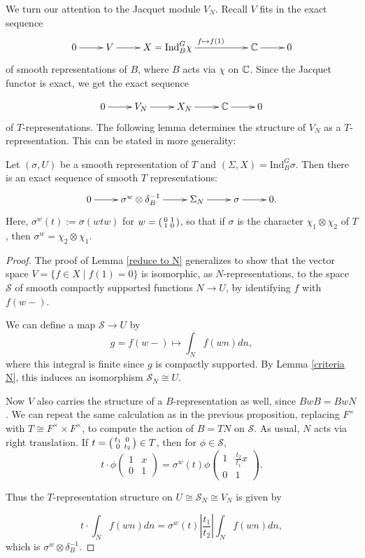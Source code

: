 We turn our attention to the Jacquet module $V_N$. Recall $V$ fits in the exact sequence
$$\xymatrix{0 \ar[r] & V \ar[r] & X = \mathrm{Ind}_B^G \chi \ar[rr]^{f \mapsto f(1)} && \CC \ar[r] & 0}$$ of smooth representations of $B$, where $B$ acts via $\chi$ on $\mathbb{C}$. Since the Jacquet functor is exact, we get the exact sequence

$$\xymatrix{0 \ar[r] & V_N \ar[r] & X_N \ar[r] & \CC \ar[r] & 0}$$ of $T$-representations. The following lemma determines the structure of $V_N$ as a $T$-representation. This can be stated in more generality:

\begin{lemma}
    Let $(\sigma, U)$ be a smooth representation of $T$ and $(\Sigma, X) = \mathrm{Ind}_B^G \sigma$. Then there is an exact sequence of smooth $T$ representations:
    $$\xymatrix{0 \ar[r] & \sigma^w \otimes \delta_B^{-1} \ar[r] & \Sigma_N \ar[r] & \sigma \ar[r] & 0.}$$
    Here, $\sigma^w(t) := \sigma(wtw)$ for $w=\begin{psmallmatrix}
        0&1\\1&0
    \end{psmallmatrix}$, so that if $\sigma$ is the character $\chi_1 \otimes \chi_2$ of $T$, then $\sigma^w = \chi_2\otimes \chi_1$.
\end{lemma}
\begin{proof}
    The proof of Lemma \ref{reduce to N} generalizes to show that the vector space $V = \{f \in X \mid f(1)=0\}$ is isomorphic, as $N$-representations, to the space $\mathcal S$ of smooth compactly supported functions $N \to U$, by identifying $f$ with $f(w-)$.



    We can define a map $\mathcal S \to U$ by 
    $$g=f(w-) \mapsto \int_N f(wn) dn,$$ where this integral is finite since $g$ is compactly supported. By Lemma \ref{criteria N}, this induces an isomorphism $\mathcal S_N \cong U$.


    Now $V$ also carries the structure of a $B$-representation as well, since $BwB=BwN$. We can repeat the same calculation as in the previous proposition, replacing $F^\times$ with $T\cong F^\times \times F^\times$, to compute the action of $B=TN$ on $\mathcal S$. As usual, $N$ acts via right translation. If $t=\begin{psmallmatrix}
        t_1&0 \\0 & t_2
    \end{psmallmatrix} \in T$, then for $\phi \in \mathcal S$, 
    $$t\cdot \phi \begin{pmatrix}
        1&x\\0&1
    \end{pmatrix} = \sigma^w(t) \phi \begin{pmatrix}
        1&\frac{t_2}{t_1}x \\ 0&1
    \end{pmatrix}.$$

    Thus the $T$-representation structure on $U \cong \mathcal S_N \cong V_N$ is given by 

    $$t \cdot \int_N f(wn)dn = \sigma^w(t) \left| \frac{t_1}{t_2} \right| \int_N f(wn)dn,$$
    which is $\sigma^w \otimes \delta_B^{-1}$.
\end{proof}

